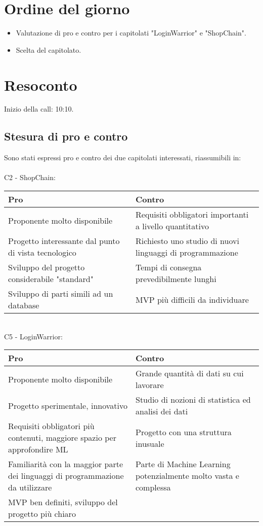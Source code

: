 \section{Ordine del giorno}

\begin{itemize}
	\item Valutazione di pro e contro per i capitolati "LoginWarrior" e "ShopChain".
	\item Scelta del capitolato.
\end{itemize}

\section{Resoconto}
Inizio della call: 10:10.
\subsection{Stesura di pro e contro}
 Sono stati espressi pro e contro dei due capitolati interessati, riassumibili in:\\ \\
 C2 - ShopChain: \\
\begin{tabular}{|p{0.50\linewidth}|p{0.50 \linewidth}|}
	\hline
	Pro & Contro                                                                                                                                             \\
	\hline
	Proponente molto disponibile & Requisiti obbligatori importanti a livello quantitativo\\
	\hline
	Progetto interessante dal punto di vista tecnologico & Richiesto uno studio di nuovi linguaggi di programmazione \\
	\hline
	Sviluppo del progetto considerabile "standard" & Tempi di consegna prevedibilmente lunghi\\
	\hline
	Sviluppo di parti simili ad un database& MVP più difficili da individuare \\
	\hline
\end{tabular}
\medskip
\\\noindent
 C5 - LoginWarrior: \\
\begin{tabular}{|p{0.50\linewidth}|p{0.50 \linewidth}|}
	\hline
	Pro & Contro                                                                                                                                             \\
	\hline
	Proponente molto disponibile & Grande quantità di dati su cui lavorare \\
	\hline
	Progetto sperimentale, innovativo & Studio di nozioni di statistica ed analisi dei dati \\
	\hline
	Requisiti obbligatori più contenuti, maggiore spazio per approfondire ML & Progetto con una struttura inusuale\\
	\hline
	Familiarità con la maggior parte dei linguaggi di programmazione da utilizzare& Parte di Machine Learning potenzialmente molto vasta e complessa\\
	\hline
	MVP ben definiti, sviluppo del progetto più chiaro&\\
	\hline
\end{tabular}
